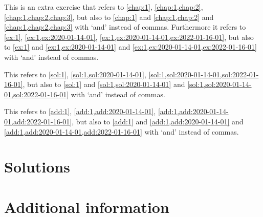 \documentclass[oneside]{book}
\begin{document}
\begin{exercise}
This is an extra exercise that refers to \cref{chap:1}, \cref{chap:1,chap:2}, \cref{chap:1,chap:2,chap:3},
but also to \cref{chap:1} and \cref{chap:1,chap:2} and \cref{chap:1,chap:2,chap:3} with `and' instead of commas.
Furthermore it refers to \cref{ex:1}, \cref{ex:1,ex:2020-01-14-01}, \cref{ex:1,ex:2020-01-14-01,ex:2022-01-16-01},
but also to \cref{ex:1} and \cref{ex:1,ex:2020-01-14-01} and \cref{ex:1,ex:2020-01-14-01,ex:2022-01-16-01} with `and' instead of commas.
\end{exercise}

\begin{solution}
This refers to \cref{sol:1}, \cref{sol:1,sol:2020-01-14-01}, \cref{sol:1,sol:2020-01-14-01,sol:2022-01-16-01},
but also to \cref{sol:1} and \cref{sol:1,sol:2020-01-14-01} and \cref{sol:1,sol:2020-01-14-01,sol:2022-01-16-01} with `and' instead of commas.
\end{solution}

\begin{additionalinformation}
This refers to \cref{add:1}, \cref{add:1,add:2020-01-14-01}, \cref{add:1,add:2020-01-14-01,add:2022-01-16-01},
but also to \cref{add:1} and \cref{add:1,add:2020-01-14-01} and \cref{add:1,add:2020-01-14-01,add:2022-01-16-01} with `and' instead of commas.
\end{additionalinformation}

\chapter{Solutions}

\chapter{Additional information}

\SaveReplacements
\end{document}
